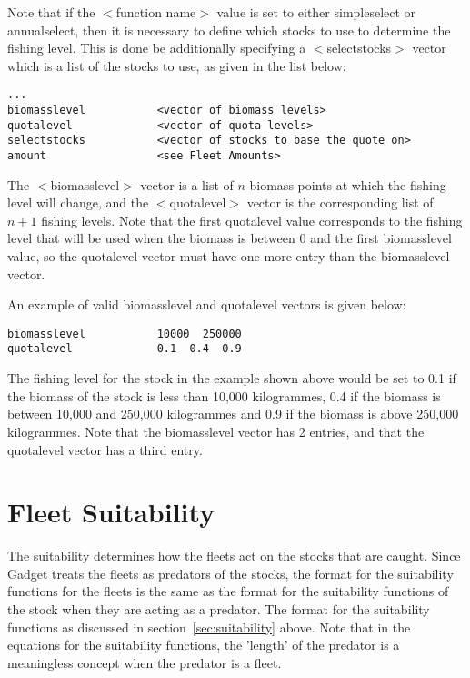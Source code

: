 \documentclass[10pt,twoside]{book}
\begin{document}
\bigskip
Note that if the $<$function name$>$ value is set to either simpleselect or annualselect, then it is necessary to define which stocks to use to determine the fishing level. This is done be additionally specifying a $<$selectstocks$>$ vector which is a list of the stocks to use, as given in the list below:

{\small\begin{verbatim}
...
biomasslevel           <vector of biomass levels>
quotalevel             <vector of quota levels>
selectstocks           <vector of stocks to base the quote on>
amount                 <see Fleet Amounts>
\end{verbatim}}

The $<$biomasslevel$>$ vector is a list of $n$ biomass points at which the fishing level will change, and the $<$quotalevel$>$ vector is the corresponding list of $n+1$ fishing levels.  Note that the first quotalevel value corresponds to the fishing level that will be used when the biomass is between 0 and the first biomasslevel value, so the quotalevel vector must have one more entry than the biomasslevel vector.

\bigskip
An example of valid biomasslevel and quotalevel vectors is given below:

{\small\begin{verbatim}
biomasslevel           10000  250000
quotalevel             0.1  0.4  0.9
\end{verbatim}}

The fishing level for the stock in the example shown above would be set to 0.1 if the biomass of the stock is less than 10,000 kilogrammes, 0.4 if the biomass is between 10,000 and 250,000 kilogrammes and 0.9 if the biomass is above 250,000 kilogrammes.  Note that the biomasslevel vector has 2 entries, and that the quotalevel vector has a third entry.

\section{Fleet Suitability}\label{sec:fleetsuit}
The suitability determines how the fleets act on the stocks that are caught.  Since Gadget treats the fleets as predators of the stocks, the format for the suitability functions for the fleets is the same as the format for the suitability functions of the stock when they are acting as a predator.  The format for the suitability functions as discussed in section~\ref{sec:suitability} above.  Note that in the equations for the suitability functions, the 'length' of the predator is a meaningless concept when the predator is a fleet.
\end{document}
